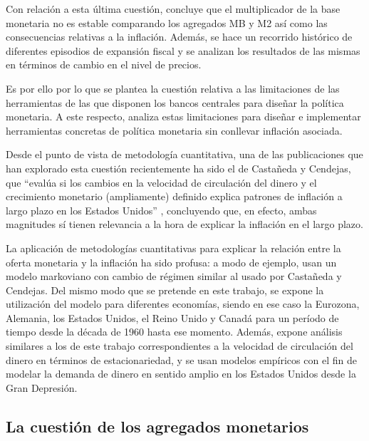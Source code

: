 \documentclass[titlepage, 12pt]{article}
\begin{document}
Con relación a esta última cuestión, \cite{bordo2021} concluye que el multiplicador de la base monetaria no es estable comparando los agregados MB y M2 así como las consecuencias relativas a la inflación. Además, se hace un recorrido histórico de diferentes episodios de expansión fiscal y se analizan los resultados de las mismas en términos de cambio en el nivel de precios.

Es por ello por lo que se plantea la cuestión relativa a las limitaciones de las herramientas de las que disponen los bancos centrales para diseñar la política monetaria. A este respecto, \cite{congdon2021} analiza estas limitaciones para diseñar e implementar herramientas concretas de política monetaria sin conllevar inflación asociada.

Desde el punto de vista de metodología cuantitativa, una de las publicaciones que han explorado esta cuestión recientemente ha sido el de Castañeda y Cendejas, que \enquote{evalúa si los cambios en la velocidad de circulación del dinero y el crecimiento monetario (ampliamente) definido explica patrones de inflación a largo plazo en los Estados Unidos} \autocite[2]{castaneda2023}, concluyendo que, en efecto, ambas magnitudes sí tienen relevancia a la hora de explicar la inflación en el largo plazo.

La aplicación de metodologías cuantitativas para explicar la relación entre la oferta monetaria y la inflación ha sido profusa: a modo de ejemplo, \cite{amisano2013} usan un modelo markoviano con cambio de régimen similar al usado por Castañeda y Cendejas. Del mismo modo que se pretende en este trabajo, se expone la utilización del modelo para diferentes economías, siendo en ese caso la Eurozona, Alemania, los Estados Unidos, el Reino Unido y Canadá para un período de tiempo desde la década de 1960 hasta ese momento. Además, \cite{anderson2017} expone análisis similares a los de este trabajo correspondientes a la velocidad de circulación del dinero en términos de estacionariedad, y se usan modelos empíricos con el fin de modelar la demanda de dinero en sentido amplio en los Estados Unidos desde la Gran Depresión.

\subsection{La cuestión de los agregados monetarios}
\end{document}
